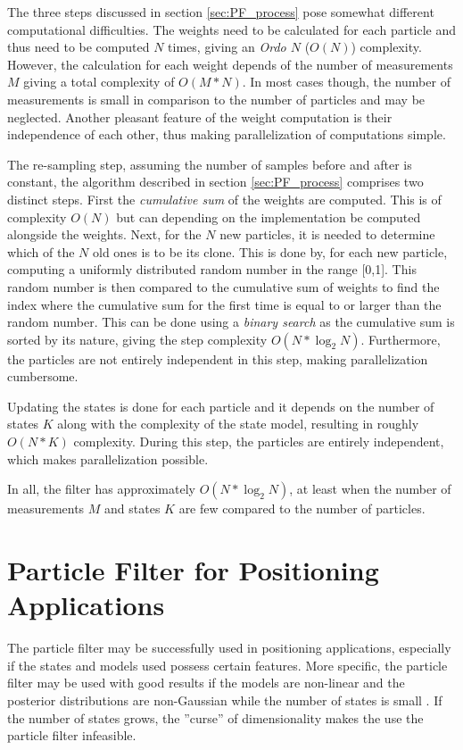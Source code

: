 \documentclass{LTHthesis}
\begin{document}
The three steps discussed in section \ref{sec:PF_process} pose somewhat different computational difficulties. The weights need to be calculated for each particle and thus need to be computed $N$ times, giving an \emph{Ordo $N$} ($O(N)$) complexity. However, the calculation for each weight depends of the number of measurements $M$ giving a total complexity of $O(M*N)$. In most cases though, the number of measurements is small in comparison to the number of particles and may be neglected. Another pleasant feature of the weight computation is their independence of each other, thus making parallelization of computations simple.

The re-sampling step, assuming the number of samples before and after is constant, the algorithm described in section \ref{sec:PF_process} comprises two distinct steps. First the \emph{cumulative sum} of the weights are computed. This is of complexity $O(N)$ but can depending on the implementation be computed alongside the weights. Next, for the $N$ new particles, it is needed to determine which of the $N$ old ones is to be its clone. This is done by, for each new particle, computing a uniformly distributed random number in the range [0,1]. This random number is then compared to the cumulative sum of weights to find the index where the cumulative sum for the first time is equal to or larger than the random number. This can be done using a \emph{binary search} as the cumulative sum is sorted by its nature, giving the step complexity $O(N*\log_2{N})$. Furthermore, the particles are not entirely independent in this step, making parallelization cumbersome.

Updating the states is done for each particle and it depends on the number of states $K$ along with the complexity of the state model, resulting in roughly $O(N*K)$ complexity. During this step, the particles are entirely independent, which makes parallelization possible.

In all, the filter has approximately $O(N*\log_2{N})$, at least when the number of measurements $M$ and states $K$ are few compared to the number of particles.       
%
\section{Particle Filter for Positioning Applications}
%
The particle filter may be successfully used in positioning applications, especially if the states and models used possess certain features. More specific, the particle filter may be used with good results if the models are non-linear and the posterior distributions are non-Gaussian while the number of states is small \cite{gson12}. If the number of states grows, the ''curse'' of dimensionality makes the use the particle filter infeasible.
\end{document}
